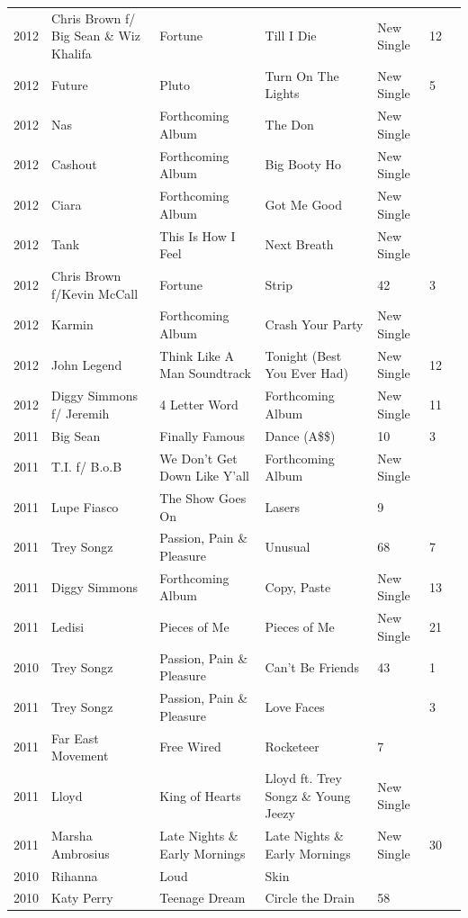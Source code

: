 \documentclass{article}
\begin{document}
\begin{tabular}{lllllll}
2012 & Chris Brown f/ Big Sean \& Wiz Khalifa & Fortune & Till I Die & New Single & 12 &  \\
2012 & Future & Pluto & Turn On The Lights & New Single & 5 &  \\
2012 & Nas & Forthcoming Album & The Don & New Single &  &  \\
2012 & Cashout & Forthcoming Album & Big Booty Ho & New Single &  &  \\
2012 & Ciara & Forthcoming Album & Got Me Good & New Single &  &  \\
2012 & Tank & This Is How I Feel & Next Breath & New Single &  &  \\
2012 & Chris Brown f/Kevin McCall & Fortune & Strip & 42 & 3 &  \\
2012 & Karmin & Forthcoming Album & Crash Your Party & New Single &  &  \\
2012 & John Legend & Think Like A Man Soundtrack & Tonight (Best You Ever Had) & New Single & 12 &  \\
2012 & Diggy Simmons f/ Jeremih & 4 Letter Word & Forthcoming Album & New Single & 11 &  \\
2011 & Big Sean & Finally Famous & Dance (A\$\$) & 10 & 3 &  \\
2011 & T.I. f/ B.o.B & We Don't Get Down Like Y'all & Forthcoming Album & New Single &  &  \\
2011 & Lupe Fiasco & The Show Goes On & Lasers & 9 &  &  \\
2011 & Trey Songz & Passion, Pain \& Pleasure & Unusual & 68 & 7 &  \\
2011 & Diggy Simmons & Forthcoming Album & Copy, Paste & New Single & 13 &  \\
2011 & Ledisi & Pieces of Me & Pieces of Me & New Single & 21 &  \\
2010 & Trey Songz & Passion, Pain \& Pleasure & Can't Be Friends & 43 & 1 &  \\
2011 & Trey Songz & Passion, Pain \& Pleasure & Love Faces &  & 3 &  \\
2011 & Far East Movement & Free Wired & Rocketeer & 7 &  &  \\
2011 & Lloyd & King of Hearts & Lloyd ft. Trey Songz \& Young Jeezy & New Single &  &  \\
2011 & Marsha Ambrosius & Late Nights \& Early Mornings & Late Nights \& Early Mornings & New Single & 30 &  \\
2010 & Rihanna & Loud & Skin &  &  &  \\
2010 & Katy Perry & Teenage Dream & Circle the Drain & 58 &  &  \\

\end{tabular}
\end{document}
